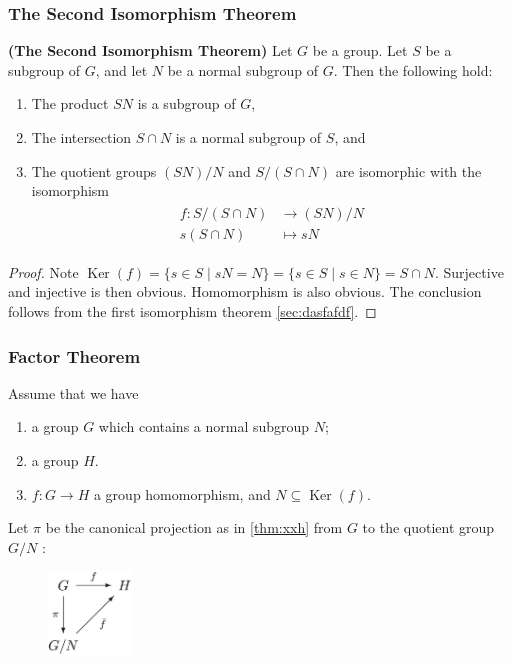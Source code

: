 \documentclass{article}
\newcommand{\bfs}[1]{\textbf{({#1}) }}
\newcommand{\Ker}{\operatorname{Ker}}
\begin{document}
\subsubsection{The Second Isomorphism Theorem}
\begin{thma}\bfs{The Second Isomorphism Theorem}
Let $G$ be a group. Let $S$ be a subgroup of $G$, and let $N$ be a normal subgroup of $G$. Then the following hold:
\begin{enumerate}
    \item The product $S N$ is a subgroup of $G$,
    \item The intersection $S \cap N$ is a normal subgroup of $S$, and
    \item The quotient groups $(S N) / N$ and $S /(S \cap N)$ are isomorphic with the isomorphism
    \begin{align*}
\begin{aligned}
f: S /(S \cap N) & \rightarrow (S N) / N \\
s (S \cap N) & \mapsto sN
\end{aligned}
\end{align*}
\end{enumerate}
\begin{proof}
Note $\Ker(f)=\{s \in S \mid s N=N\}=\{s \in S \mid s \in N\}=S \cap N$. Surjective  and injective is then obvious. Homomorphism is also obvious. The conclusion follows from the first isomorphism theorem \cref{sec:dasfafdf}.
\end{proof}
\end{thma}

\subsubsection{Factor Theorem}\label{sec:indqddc}

Assume that we have
\begin{enumerate}
    \item  a group $G$ which contains a normal subgroup $N$;
    \item a group $H$.
 \item $f: G \rightarrow H$ a group homomorphism, and $N\subseteq \Ker(f)$.
\end{enumerate}

Let $\pi$ be the canonical projection as in \cref{thm:xxh} from $G$ to the quotient group $G / N$ :
\vspace{-0.45cm}
\begin{figure}[h]
\centering
\includegraphics[width=0.2\textwidth]{Figs/2.png}
\end{figure}
\vspace{-0.55cm}
\end{document}
